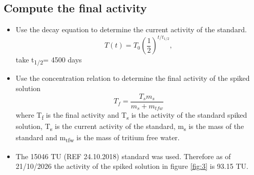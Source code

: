 \documentclass[12pt]{article}
\begin{document}
\subsection{Compute the final activity}
\begin{itemize}

\item Use the decay equation to determine the current activity of the standard.
\begin{equation}
T(t)=T_0
\left(\frac{1}{2}\right)^{t/t_{1/2}},
\end{equation}
take t\textsubscript{1/2}= 4500 days
\item Use the concentration relation to determine the final activity of the spiked solution
\begin{equation}
T_f=\frac{T_{s}m_{s}}{m_{s}+m_{tfw}}
\end{equation}
where T\textsubscript{f} is the final activity and T\textsubscript{s} is the activity of the standard spiked solution, T\textsubscript{s} is the current activity of the standard, m\textsubscript{s} is the mass of the standard and m\textsubscript{tfw} is the mass of tritium free water.

\item The 15046 TU (REF 24.10.2018) standard was used. Therefore as of 21/10/2026 the activity of the spiked solution in figure \ref{fig:3} is 93.15 TU.
\end{itemize}
%
%
\end{document}
